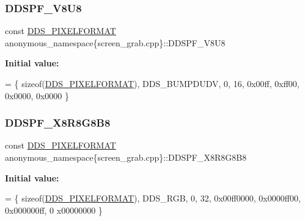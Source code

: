 \subsubsection{\texorpdfstring{D\+D\+S\+P\+F\+\_\+\+V8\+U8}{DDSPF\_V8U8}}
{\footnotesize\ttfamily const \mbox{\hyperlink{structanonymous__namespace_02screen__grab_8cpp_03_1_1_d_d_s___p_i_x_e_l_f_o_r_m_a_t}{D\+D\+S\+\_\+\+P\+I\+X\+E\+L\+F\+O\+R\+M\+AT}} anonymous\+\_\+namespace\{screen\+\_\+grab.\+cpp\}\+::D\+D\+S\+P\+F\+\_\+\+V8\+U8}

{\bfseries Initial value\+:}
\begin{DoxyCode}
= 
        \{ \textcolor{keyword}{sizeof}(\mbox{\hyperlink{struct_d_d_s___p_i_x_e_l_f_o_r_m_a_t}{DDS\_PIXELFORMAT}}), DDS\_BUMPDUDV, 0, 16, 0x00ff, 0xff00, 0x0000, 0x0000 \}
\end{DoxyCode}
\mbox{\label{namespaceanonymous__namespace_02screen__grab_8cpp_03_ae5387fea07c7bda8e838d7a973d37758}} 
\subsubsection{\texorpdfstring{D\+D\+S\+P\+F\+\_\+\+X8\+R8\+G8\+B8}{DDSPF\_X8R8G8B8}}
{\footnotesize\ttfamily const \mbox{\hyperlink{structanonymous__namespace_02screen__grab_8cpp_03_1_1_d_d_s___p_i_x_e_l_f_o_r_m_a_t}{D\+D\+S\+\_\+\+P\+I\+X\+E\+L\+F\+O\+R\+M\+AT}} anonymous\+\_\+namespace\{screen\+\_\+grab.\+cpp\}\+::D\+D\+S\+P\+F\+\_\+\+X8\+R8\+G8\+B8}

{\bfseries Initial value\+:}
\begin{DoxyCode}
=
        \{ \textcolor{keyword}{sizeof}(\mbox{\hyperlink{struct_d_d_s___p_i_x_e_l_f_o_r_m_a_t}{DDS\_PIXELFORMAT}}), DDS\_RGB,  0, 32, 0x00ff0000, 0x0000ff00, 0x000000ff, 0
      x00000000 \}
\end{DoxyCode}
\mbox{\label{namespaceanonymous__namespace_02screen__grab_8cpp_03_a0d63d6af4d1b918ce698d533d92eb8d1}} 
